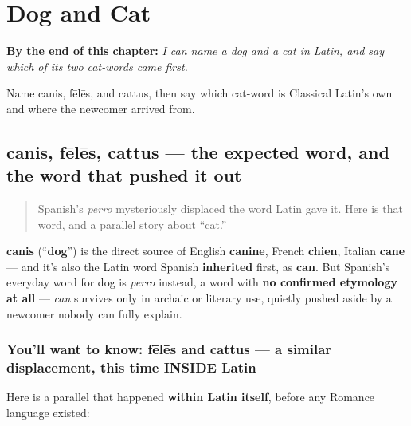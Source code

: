 
\chapter{Dog and Cat}
\label{ch:la-dog-and-cat}

\begin{chapteropening}
\textbf{By the end of this chapter:} \emph{I can name a dog and a cat in Latin, and say which of its two cat-words came first.}

Name canis, fēlēs, and cattus, then say which cat-word is Classical Latin's own and where the newcomer arrived from.
\end{chapteropening}

\section[canis, fēlēs, cattus]{canis, fēlēs, cattus — the expected word, and the word that pushed it out}

\label{lesson:LA-C17-canis-feles-cattus}



\begin{quote}
Spanish's \emph{perro} mysteriously displaced the word Latin gave it. Here is that word, and a parallel story about \textquotedblleft{}cat.\textquotedblright{}
\end{quote}

\begin{cousinweb}
\textbf{canis} (\textquotedblleft{}\textbf{dog}\textquotedblright{}) is the direct source of English \textbf{canine}, French \textbf{chien}, Italian \textbf{cane} — and it's also the Latin word Spanish \textbf{inherited} first, as \textbf{can}. But Spanish's everyday word for dog is \emph{perro} instead, a word with \textbf{no confirmed etymology at all} — \emph{can} survives only in archaic or literary use, quietly pushed aside by a newcomer nobody can fully explain.
\end{cousinweb}

\subsection*{You'll want to know: fēlēs and cattus — a similar displacement, this time INSIDE Latin}
Here is a parallel that happened \textbf{within Latin itself}, before any Romance language existed:

